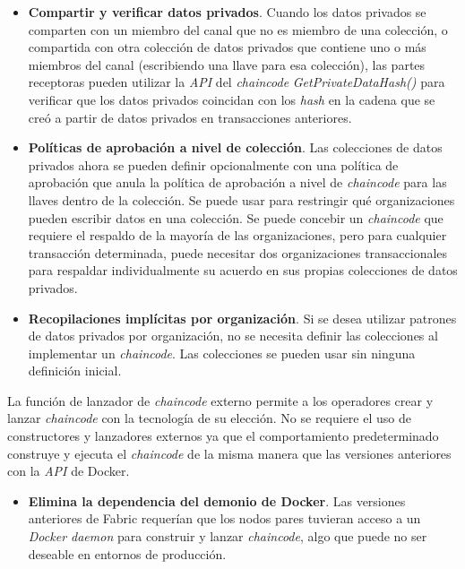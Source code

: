 {\begin{itemize}
\item {\bf Compartir y verificar datos privados}. Cuando los datos privados se comparten con un miembro del canal que no es miembro de una colecci\'on, o compartida con otra colecci\'on de datos privados que contiene uno o m\'as miembros del canal (escribiendo una llave para esa colecci\'on), las partes receptoras pueden utilizar la \emph{API} del \emph{chaincode} \emph{GetPrivateDataHash()} para verificar que los datos privados coincidan con los \emph{hash} en la cadena que se cre\'o a partir de datos privados en transacciones anteriores.

\item {\bf Pol\'iticas de aprobaci\'on a nivel de colecci\'on}. Las colecciones de datos privados ahora se pueden definir opcionalmente con una pol\'itica de aprobaci\'on que anula la pol\'itica de aprobaci\'on a nivel de \emph{chaincode} para las llaves dentro de la colecci\'on. Se puede usar para restringir qu\'e organizaciones pueden escribir datos en una colecci\'on. Se puede concebir un \emph{chaincode} que requiere el respaldo de la mayor\'ia de las organizaciones, pero para cualquier transacci\'on determinada, puede necesitar dos organizaciones transaccionales para respaldar individualmente su acuerdo en sus propias colecciones de datos privados.

\item {\bf Recopilaciones impl\'icitas por organizaci\'on}. Si se desea utilizar patrones de datos privados por organizaci\'on, no se necesita definir las colecciones al implementar un \emph{chaincode}. Las colecciones se pueden usar sin ninguna definici\'on inicial.
\end{itemize}

La funci\'on de lanzador de \emph{chaincode} externo permite a los operadores crear y lanzar \emph{chaincode} con la tecnolog\'ia de su elecci\'on. No se requiere el uso de constructores y lanzadores externos ya que el comportamiento predeterminado construye y ejecuta el \emph{chaincode} de la misma manera que las versiones anteriores con la \emph{API} de Docker.

\begin{itemize}
\item {\bf Elimina la dependencia del demonio de Docker}. Las versiones anteriores de Fabric requer\'ian que los nodos pares tuvieran acceso a un \emph{Docker daemon}  para construir y lanzar \emph{chaincode}, algo que puede no ser deseable en entornos de producci\'on.


\end{itemize}}
